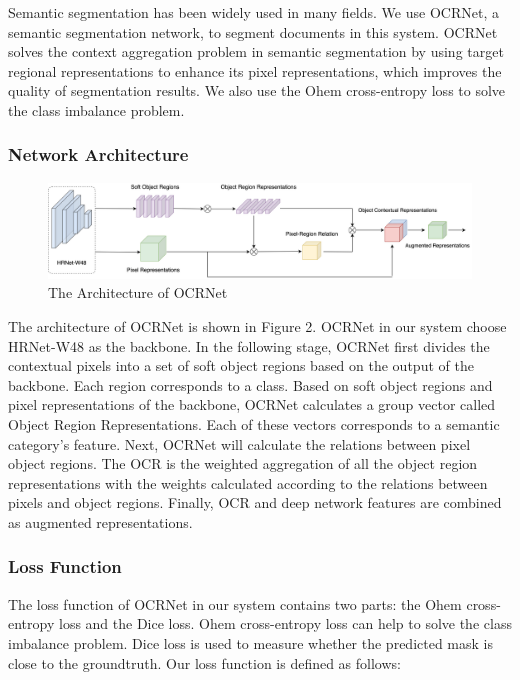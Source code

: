 \documentclass[10pt, conference, compsocconf]{IEEEtran}
\begin{document}
Semantic segmentation has been widely used in many fields. 
We use OCRNet\cite{yuan2020object}, a semantic segmentation network, to segment documents in this system. 
OCRNet solves the context aggregation problem in semantic segmentation by using target regional representations to enhance its pixel representations, which improves the quality of segmentation results. 
We also use the Ohem cross-entropy\cite{shrivastava2016training} loss to solve the class imbalance problem. 

\subsubsection{Network Architecture}

\begin{figure}[!h]
	\centering
	\includegraphics[width=7in]{./Assets/131245.jpg}
	\caption{The Architecture of OCRNet}
\end{figure}

The architecture of OCRNet is shown in Figure 2. OCRNet in our system choose HRNet-W48\cite{wang2020deep} as the backbone. In the following stage, OCRNet first divides the contextual pixels into a set of soft object regions based on the output of the backbone. Each region corresponds to a class. Based on soft object regions and pixel representations of the backbone, OCRNet calculates a group vector called Object Region Representations. Each of these vectors corresponds to a semantic category's feature. Next, OCRNet will calculate the relations between pixel object regions. The OCR is the weighted aggregation of all the object region representations with the weights calculated according to the relations between pixels and object regions\cite{yuan2020object}. Finally, OCR and deep network features are combined as augmented representations.


\subsubsection{Loss Function}

The loss function of OCRNet in our system contains two parts: the Ohem cross-entropy loss\cite{shrivastava2016training} and the Dice loss\cite{milletari2016v}.
Ohem cross-entropy loss can help to solve the class imbalance problem. Dice loss is used to measure whether the predicted mask is close to the groundtruth. Our loss function is defined as follows:
\end{document}
